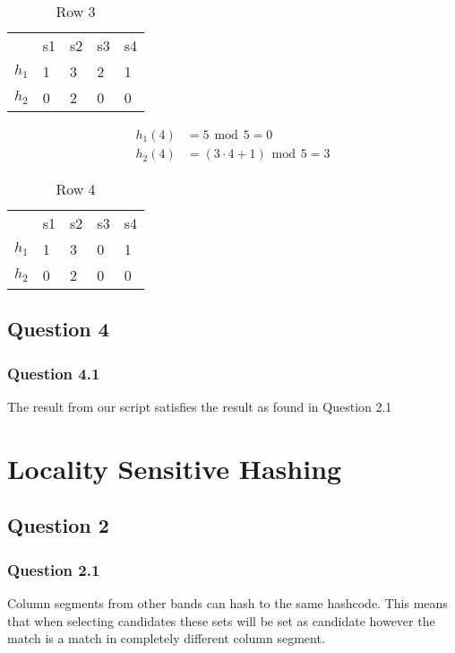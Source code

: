 \documentclass[11pt,twoside,a4paper]{article}
\begin{document}
	\begin{table}[h!]
	\centering
	\label{my-label}
	\begin{tabular}{lllll}
	 & s1 & s2 & s3 & s4 \\
	 $h_1$ & 1 & 3 & 2 & 1 \\
	 $h_2$ & 0 & 2 & 0 & 0
	\end{tabular}
	\caption{Row 3}
	\end{table}
	
	\begin{align}
		h_1(4) &= 5 \hspace{5pt} \mbox{mod} \hspace{5pt} 5 = 0 \\
		h_2(4) &= (3 \cdot 4 + 1) \hspace{5pt} \mbox{mod} \hspace{5pt} 5 = 3
	\end{align}
	
	\begin{table}[h!]
	\centering
	\label{my-label}
	\begin{tabular}{lllll}
	 & s1 & s2 & s3 & s4 \\
	 $h_1$ & 1 & 3 & 0 & 1 \\
	 $h_2$ & 0 & 2 & 0 & 0
	\end{tabular}
	\caption{Row 4}
	\end{table}

	
\section{Question 4}

 	\subsection{Question 4.1}
 	The result from our script satisfies the result as found in Question 2.1
 	
 \chapter{Locality Sensitive Hashing}
 
 \section{Question 2}
 
 	\subsection{Question 2.1}
 	Column segments from other bands can hash to the same hashcode. This means that when selecting candidates these sets will be set as candidate however the match is a match in completely different column segment.
 	 	
\end{document}
